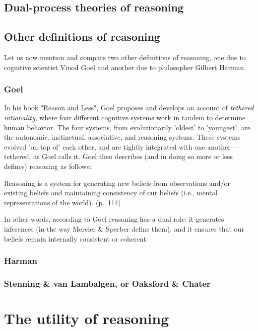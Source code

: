 \subsection{Dual-process theories of reasoning}

\subsection{Other definitions of reasoning}
Let us now mention and compare two other definitions of reasoning, one due to cognitive scientist Vinod Goel and another due to philosopher Gilbert Harman.

\subsubsection{Goel}
In his \citeyear{Goel22} book "Reason and Less", Goel proposes and develops an account of \emph{tethered rationality}, where four different cognitive systems work in tandem to determine human behavior. The four systems, from evolutionarily 'oldest' to 'youngest', are the autonomic, instinctual, associative, and reasoning systems. These systems evolved 'on top of' each other, and are tightly integrated with one another --- tethered, as Goel calls it.
Goel then describes (and in doing so more or less defines) reasoning as follows:
\begin{quoting}
    Reasoning is a system for generating new beliefs from observations and/or existing beliefs and maintaining consistency of our beliefs (i.e., mental representations of the world).
    \hfill (p.~114)
\end{quoting}
In other words, according to Goel reasoning has a dual role: it generates inferences (in the way Mercier \& Sperber define them), and it ensures that our beliefs remain internally consistent or coherent.

\subsubsection{Harman}

\subsubsection{Stenning \& van Lambalgen, or Oaksford \& Chater}

\section{The utility of reasoning}
\label{sec:reason-function}

